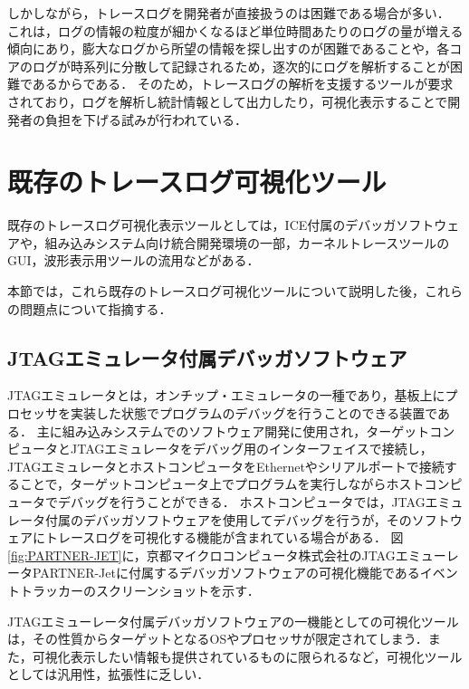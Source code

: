 しかしながら，トレースログを開発者が直接扱うのは困難である場合が多い．
これは，ログの情報の粒度が細かくなるほど単位時間あたりのログの量が増える傾向にあり，膨大なログから所望の情報を探し出すのが困難であることや，各コアのログが時系列に分散して記録されるため，逐次的にログを解析することが困難であるからである．
そのため，トレースログの解析を支援するツールが要求されており，ログを解析し統計情報として出力したり，可視化表示することで開発者の負担を下げる試みが行われている．

\section{既存のトレースログ可視化ツール}

既存のトレースログ可視化表示ツールとしては，ICE付属のデバッガソフトウェアや，組み込みシステム向け統合開発環境の一部，カーネルトレースツールのGUI，波形表示用ツールの流用などがある．

本節では，これら既存のトレースログ可視化ツールについて説明した後，これらの問題点について指摘する．

\subsection{JTAGエミュレータ付属デバッガソフトウェア}

JTAGエミュレータとは，オンチップ・エミュレータの一種であり，基板上にプロセッサを実装した状態でプログラムのデバッグを行うことのできる装置である．
主に組み込みシステムでのソフトウェア開発に使用され，ターゲットコンピュータとJTAGエミュレータをデバッグ用のインターフェイスで接続し，JTAGエミュレータとホストコンピュータをEthernetやシリアルポートで接続することで，ターゲットコンピュータ上でプログラムを実行しながらホストコンピュータでデバッグを行うことができる．
ホストコンピュータでは，JTAGエミュレータ付属のデバッガソフトウェアを使用してデバッグを行うが，そのソフトウェアにトレースログを可視化する機能が含まれている場合がある．
図\ref{fig:PARTNER-JET}に，京都マイクロコンピュータ株式会社のJTAGエミューレータPARTNER-Jet\cite{PARTNER-JET}に付属するデバッガソフトウェアの可視化機能であるイベントトラッカーのスクリーンショットを示す．

JTAGエミューレータ付属デバッガソフトウェアの一機能としての可視化ツールは，その性質からターゲットとなるOSやプロセッサが限定されてしまう．また，可視化表示したい情報も提供されているものに限られるなど，可視化ツールとしては汎用性，拡張性に乏しい．

